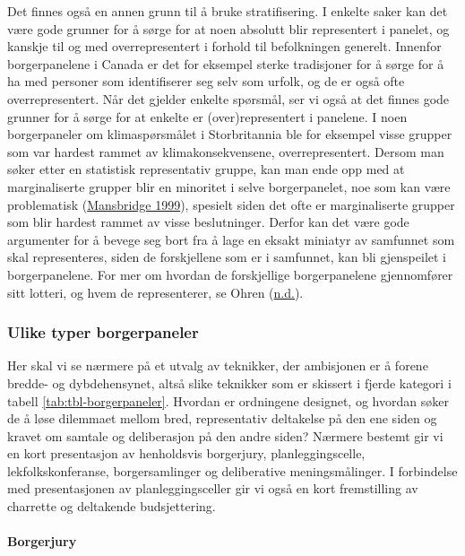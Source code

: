 \documentclass[
  12pt,
  a4paper, 12pt]{article}
\begin{document}
Det finnes også en annen grunn til å bruke stratifisering. I enkelte saker kan det være gode grunner for å sørge for at noen absolutt blir representert i panelet, og kanskje til og med overrepresentert i forhold til befolkningen generelt. Innenfor borgerpanelene i Canada er det for eksempel sterke tradisjoner for å sørge for å ha med personer som identifiserer seg selv som urfolk, og de er også ofte overrepresentert. Når det gjelder enkelte spørsmål, ser vi også at det finnes gode grunner for å sørge for at enkelte er (over)representert i panelene. I noen borgerpaneler om klimaspørsmålet i Storbritannia ble for eksempel visse grupper som var hardest rammet av klimakonsekvensene, overrepresentert. Dersom man søker etter en statistisk representativ gruppe, kan man ende opp med at marginaliserte grupper blir en minoritet i selve borgerpanelet, noe som kan være problematisk (\protect\hyperlink{ref-mansbridge_should_1999}{Mansbridge 1999}), spesielt siden det ofte er marginaliserte grupper som blir hardest rammet av visse beslutninger. Derfor kan det være gode argumenter for å bevege seg bort fra å lage en eksakt miniatyr av samfunnet som skal representeres, siden de forskjellene som er i samfunnet, kan bli gjenspeilet i borgerpanelene. For mer om hvordan de forskjellige borgerpanelene gjennomfører sitt lotteri, og hvem de representerer, se Ohren (\protect\hyperlink{ref-ohren_representative_nodate}{n.d.}).

\hypertarget{ulike-typer-borgerpaneler}{%
\subsubsection{Ulike typer borgerpaneler}\label{ulike-typer-borgerpaneler}}

Her skal vi se nærmere på et utvalg av teknikker, der ambisjonen er å forene bredde- og dybdehensynet, altså slike teknikker som er skissert i fjerde kategori i tabell \ref{tab:tbl-borgerpaneler}. Hvordan er ordningene designet, og hvordan søker de å løse dilemmaet mellom bred, representativ deltakelse på den ene siden og kravet om samtale og deliberasjon på den andre siden? Nærmere bestemt gir vi en kort presentasjon av henholdsvis borgerjury, planleggingscelle, lekfolkskonferanse, borgersamlinger og deliberative meningsmålinger. I forbindelse med presentasjonen av planleggingsceller gir vi også en kort fremstilling av charrette og deltakende budsjettering.

\hypertarget{borgerjury}{%
\paragraph{Borgerjury}\label{borgerjury}}
\end{document}
